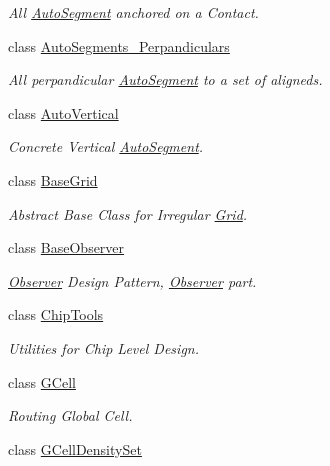 \begin{DoxyCompactItemize}
\begin{DoxyCompactList}\small\item\em All \mbox{\hyperlink{classKatabatic_1_1AutoSegment}{Auto\+Segment}} anchored on a Contact. \end{DoxyCompactList}\item 
class \mbox{\hyperlink{classKatabatic_1_1AutoSegments__Perpandiculars}{Auto\+Segments\+\_\+\+Perpandiculars}}
\begin{DoxyCompactList}\small\item\em All perpandicular \mbox{\hyperlink{classKatabatic_1_1AutoSegment}{Auto\+Segment}} to a set of aligneds. \end{DoxyCompactList}\item 
class \mbox{\hyperlink{classKatabatic_1_1AutoVertical}{Auto\+Vertical}}
\begin{DoxyCompactList}\small\item\em Concrete Vertical \mbox{\hyperlink{classKatabatic_1_1AutoSegment}{Auto\+Segment}}. \end{DoxyCompactList}\item 
class \mbox{\hyperlink{classKatabatic_1_1BaseGrid}{Base\+Grid}}
\begin{DoxyCompactList}\small\item\em Abstract Base Class for Irregular \mbox{\hyperlink{classKatabatic_1_1Grid}{Grid}}. \end{DoxyCompactList}\item 
class \mbox{\hyperlink{classKatabatic_1_1BaseObserver}{Base\+Observer}}
\begin{DoxyCompactList}\small\item\em \mbox{\hyperlink{classKatabatic_1_1Observer}{Observer}} Design Pattern, \mbox{\hyperlink{classKatabatic_1_1Observer}{Observer}} part. \end{DoxyCompactList}\item 
class \mbox{\hyperlink{classKatabatic_1_1ChipTools}{Chip\+Tools}}
\begin{DoxyCompactList}\small\item\em Utilities for Chip Level Design. \end{DoxyCompactList}\item 
class \mbox{\hyperlink{classKatabatic_1_1GCell}{G\+Cell}}
\begin{DoxyCompactList}\small\item\em Routing Global Cell. \end{DoxyCompactList}\item 
class \mbox{\hyperlink{classKatabatic_1_1GCellDensitySet}{G\+Cell\+Density\+Set}}

\end{DoxyCompactItemize}
